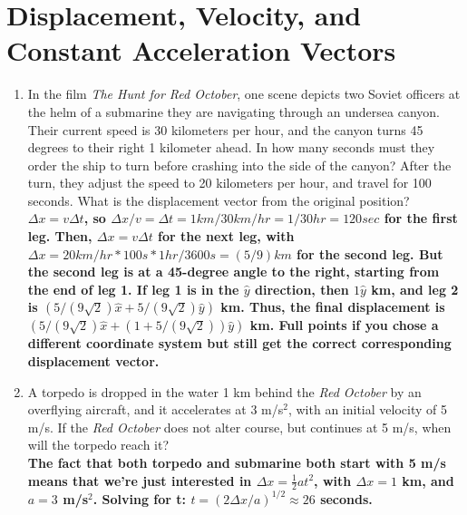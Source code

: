 \documentclass[10pt]{article}
\begin{document}
\section{Displacement, Velocity, and Constant Acceleration Vectors}
\begin{enumerate}
\item In the film \textit{The Hunt for Red October}, one scene depicts two Soviet officers at the helm of a submarine they are navigating through an undersea canyon.  Their current speed is 30 kilometers per hour, and the canyon turns 45 degrees to their right 1 kilometer ahead.  In how many seconds must they order the ship to turn before crashing into the side of the canyon?  After the turn, they adjust the speed to 20 kilometers per hour, and travel for 100 seconds.  What is the displacement vector from the original position?
\vspace{0.5 cm} \\
\textbf{$\Delta x = v\Delta t$, so $\Delta x/v = \Delta t = 1 km/30 km/hr = 1/30 hr = 120 sec$ for the first leg.  Then, $\Delta x = v\Delta t$ for the next leg, with $\Delta x = 20 km/hr*100s*1hr/3600s = (5/9) km$ for the second leg.  But the second leg is at a 45-degree angle to the right, starting from the end of leg 1.  If leg 1 is in the $\hat{y}$ direction, then $1 \hat{y}$ km, and leg 2 is $(5/(9\sqrt{2})\hat{x} + 5/(9\sqrt{2})\hat{y})$ km. Thus, the final displacement is $(5/(9\sqrt{2})\hat{x} + (1+5/(9\sqrt{2}))\hat{y})$ km.  Full points if you chose a different coordinate system but still get the correct corresponding displacement vector.}
\vspace{0.4 cm}
\item A torpedo is dropped in the water 1 km behind the \textit{Red October} by an overflying aircraft, and it accelerates at 3 m/s$^2$, with an initial velocity of 5 m/s.  If the \textit{Red October} does not alter course, but continues at 5 m/s, when will the torpedo reach it?
\vspace{0.5 cm} \\
\textbf{The fact that both torpedo and submarine both start with 5 m/s means that we're just interested in $\Delta x = \frac{1}{2}at^2$, with $\Delta x = 1$ km, and $a=3$ m/s$^2$.  Solving for t: $t = (2\Delta x/a)^{1/2} \approx 26$ seconds.}
\vspace{0.4 cm}
\end{enumerate}
\end{document}
